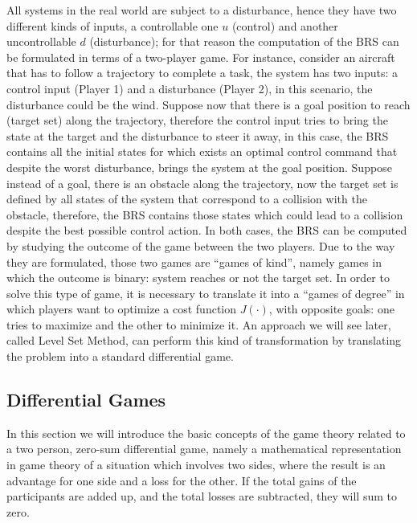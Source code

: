 All systems in the real world are subject to a disturbance, hence they have two different kinds of inputs, a controllable one $u$ (control) and another uncontrollable $d$ (disturbance); for that reason the computation of the BRS can be formulated in terms of a two-player game. For instance, consider an aircraft that has to follow a trajectory to complete a task, the system has two inputs: a control input (Player 1) and a disturbance (Player 2), in this scenario, the disturbance could be the wind. Suppose now that there is a goal position to reach (target set) along the trajectory, therefore the control input tries to bring the state at the target and the disturbance to steer it away, in this case, the BRS contains all the initial states for which exists an optimal control command that despite the worst disturbance, brings the system at the goal position. Suppose instead of a goal, there is an obstacle along the trajectory, now the target set is defined by all states of the system that correspond to a collision with the obstacle, therefore, the BRS contains those states which could lead to a collision despite the best possible control action. In both cases, the BRS can be computed by studying the outcome of the game between the two players. Due to the way they are formulated, those two games are “games of kind”, namely games in which the outcome is binary: system reaches or not the target set. In order to solve this type of game, it is necessary to translate it into a “games of degree” in which players want to optimize a cost function $J(\cdot)$, with opposite goals: one tries to maximize and the other to minimize it. An approach we will see later, called Level Set Method, can perform this kind of transformation by translating the problem into a standard differential game.

\subsection{Differential Games}
In this section we will introduce the basic concepts of the game theory related to a two person, zero-sum differential game, namely a mathematical representation in game theory of a situation which involves two sides, where the result is an advantage for one side and a loss for the other. If the total gains of the participants are added up, and the total losses are subtracted, they will sum to zero.
\newline
